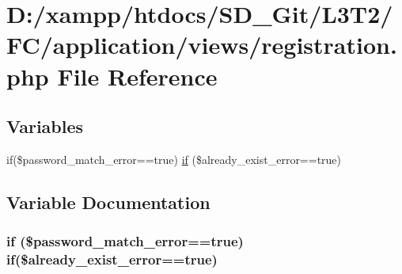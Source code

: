 \hypertarget{registration_8php}{}\section{D\+:/xampp/htdocs/\+S\+D\+\_\+\+Git/\+L3\+T2/\+F\+C/application/views/registration.php File Reference}
\label{registration_8php}
\subsection*{Variables}
\begin{DoxyCompactItemize}
\item 
if(\$password\+\_\+match\+\_\+error==true) \hyperlink{registration_8php_a91269d6673af6e157f8d80f7780ef1ca}{if} (\$already\+\_\+exist\+\_\+error==true)
\end{DoxyCompactItemize}


\subsection{Variable Documentation}
\hypertarget{registration_8php_a91269d6673af6e157f8d80f7780ef1ca}{}
\subsubsection[{if}]{\setlength{\rightskip}{0pt plus 5cm}if (\$password\+\_\+match\+\_\+error==true) if(\$already\+\_\+exist\+\_\+error==true)}\label{registration_8php_a91269d6673af6e157f8d80f7780ef1ca}
